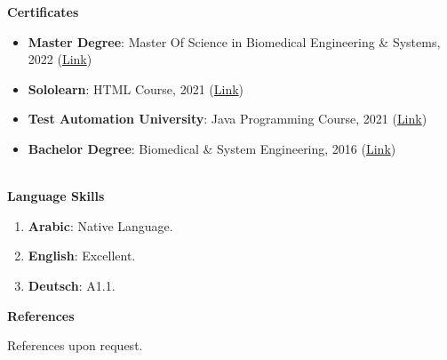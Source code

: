 \documentclass[a4paper,12pt,final]{memoir}
\newcommand{\Sep}{\vspace{1.5em}}
\newcommand{\SmallSep}{\vspace{0.5em}}
\newcommand{\CVSection}[1]
	{\Large\textbf{#1}\par
	\SmallSep\normalsize\normalfont}
\newcommand{\CVItem}[1]
	{\textbf{\color{RoyalBlue} #1}}
\begin{document}
\CVSection{Certificates}
\begin{itemize}
\item \CVItem{Master Degree}: Master Of Science in Biomedical Engineering \& Systems, 2022 (\href{https://drive.google.com/file/d/1giRjSlg57sNPhUK0scea5JC0JahuYhVl/view?usp=sharing}{Link})
\item \CVItem{Sololearn}: HTML Course, 2021 (\href{https://www.sololearn.com/Certificate/1014-20775781/jpg/}{Link})
\item \CVItem{Test Automation University}: Java Programming Course, 2021 (\href{https://firebasestorage.googleapis.com/v0/b/testautomationu-9e0b6.appspot.com/o/certificates%2FTAU-38eb3fba.png?alt=media&token=d50fb732-d2bd-451f-9c6c-a5679299aca0}{Link})
\item \CVItem{Bachelor Degree}: Biomedical \& System Engineering, 2016 (\href{https://drive.google.com/file/d/1gmelA3pLTxUbTTkS7VY0o8f30b0lenkS/view?usp=sharing}{Link})
\end{itemize}
\\
\CVSection{Language Skills}
\begin{enumerate}
\item \CVItem{Arabic}: Native Language.
\item \CVItem{English}: Excellent.
\item \CVItem{Deutsch}: A1.1.
\end{enumerate}
\Sep


\CVSection{References}
References upon request.

\end{document}
